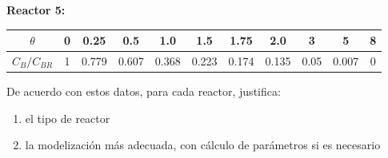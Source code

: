 {	\textbf{Reactor 5:}
	\begin{center}
		\begin{tabular}{|c|c|c|c|c|c|c|c|c|c|c|}
			\hline
			$\theta$     & 0 & 0.25  & 0.5   & 1.0   & 1.5   & 1.75  & 2.0   & 3    & 5     & 8 \\ \hline
			$C_B/C_{BR}$ & 1 & 0.779 & 0.607 & 0.368 & 0.223 & 0.174 & 0.135 & 0.05 & 0.007 & 0 \\ \hline
		\end{tabular}
	\end{center}

	De acuerdo con estos datos, para cada reactor, justifica:
	\begin{enumerate}[label={\alph*)}]
		\item el tipo de reactor
		\item la modelización más adecuada, con cálculo de parámetros si es necesario
	\end{enumerate}
}
\newpage
\solve{}
